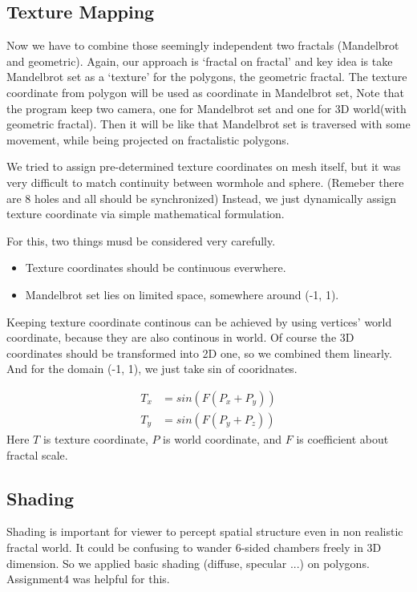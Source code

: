 \documentclass[a4paper]{article}
\begin{document}
\subsection{Texture Mapping}
Now we have to combine those seemingly independent two fractals (Mandelbrot and geometric).
Again, our approach is `fractal on fractal' and key idea is take Mandelbrot set as a `texture' for the polygons, the geometric fractal.
The texture coordinate from polygon will be used as coordinate in Mandelbrot set,
Note that the program keep two camera, one for Mandelbrot set and one for 3D world(with geometric fractal).
Then it will be like that Mandelbrot set is traversed with some movement, while being projected on fractalistic polygons.

We tried to assign pre-determined texture coordinates on mesh itself,
but it was very difficult to match continuity between wormhole and sphere. (Remeber there are 8 holes and all should be synchronized)
Instead, we just dynamically assign texture coordinate via simple mathematical formulation.

For this, two things musd be considered very carefully.
\begin{itemize}
  \item Texture coordinates should be continuous everwhere.
  \item Mandelbrot set lies on limited space, somewhere around (-1, 1).
\end{itemize}

Keeping texture coordinate continous can be achieved by using vertices' world coordinate, because they are also continous in world.
Of course the 3D coordinates should be transformed into 2D one, so we combined them linearly.
And for the domain (-1, 1), we just take sin of cooridnates.

\begin{align*}
T_x&=sin(F(P_x+P_y))\\
T_y&=sin(F(P_y+P_z))
\end{align*}
Here $T$ is texture coordinate, $P$ is world coordinate, and $F$ is coefficient about fractal scale.
\subsection{Shading}
Shading is important for viewer to percept spatial structure even in non realistic fractal world.
It could be confusing to wander 6-sided chambers freely in 3D dimension.
So we applied basic shading (diffuse, specular ...) on polygons.
Assignment4 was helpful for this.
\end{document}
